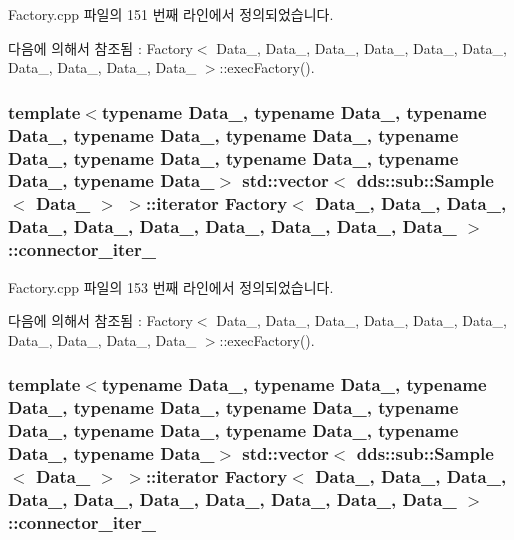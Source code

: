 Factory.\+cpp 파일의 151 번째 라인에서 정의되었습니다.



다음에 의해서 참조됨 \+:  Factory$<$ Data\+\_, Data\+\_, Data\+\_, Data\+\_, Data\+\_, Data\+\_, Data\+\_, Data\+\_, Data\+\_, Data\+\_ $>$\+::exec\+Factory().

\subsubsection[{\texorpdfstring{connector\+\_\+iter\+\_\+2}{connector_iter_2}}]{\setlength{\rightskip}{0pt plus 5cm}template$<$typename Data\+\_, typename Data\+\_, typename Data\+\_, typename Data\+\_, typename Data\+\_, typename Data\+\_, typename Data\+\_, typename Data\+\_, typename Data\+\_, typename Data\+\_$>$ std\+::vector$<$ dds\+::sub\+::\+Sample$<$ Data\+\_ $>$ $>$\+::iterator {\bf Factory}$<$ Data\+\_, Data\+\_, Data\+\_, Data\+\_, Data\+\_, Data\+\_, Data\+\_, Data\+\_, Data\+\_, Data\+\_ $>$\+::connector\+\_\+iter\+\_}\hypertarget{classFactory_acb10615bebab1e5eda677a8b41c0fd29}{}\label{classFactory_acb10615bebab1e5eda677a8b41c0fd29}


Factory.\+cpp 파일의 153 번째 라인에서 정의되었습니다.



다음에 의해서 참조됨 \+:  Factory$<$ Data\+\_, Data\+\_, Data\+\_, Data\+\_, Data\+\_, Data\+\_, Data\+\_, Data\+\_, Data\+\_, Data\+\_ $>$\+::exec\+Factory().

\subsubsection[{\texorpdfstring{connector\+\_\+iter\+\_\+3}{connector_iter_3}}]{\setlength{\rightskip}{0pt plus 5cm}template$<$typename Data\+\_, typename Data\+\_, typename Data\+\_, typename Data\+\_, typename Data\+\_, typename Data\+\_, typename Data\+\_, typename Data\+\_, typename Data\+\_, typename Data\+\_$>$ std\+::vector$<$ dds\+::sub\+::\+Sample$<$ Data\+\_ $>$ $>$\+::iterator {\bf Factory}$<$ Data\+\_, Data\+\_, Data\+\_, Data\+\_, Data\+\_, Data\+\_, Data\+\_, Data\+\_, Data\+\_, Data\+\_ $>$\+::connector\+\_\+iter\+\_}\hypertarget{classFactory_abe759623a3ab82ecd6ae3923629c397d}{}\label{classFactory_abe759623a3ab82ecd6ae3923629c397d}


